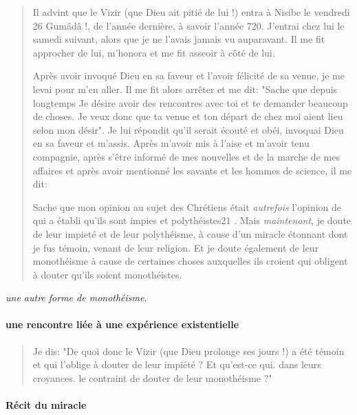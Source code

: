\begin{quote}
Il advint que le Vizir (que Dieu ait pitié de lui !) entra à Nisibe le vendredi
26 Gumâdâ !, de l'année dernière, à savoir l'année 720. J'entrai chez lui le samedi
suivant, alors que je ne l'avais jamais vu auparavant. Il me fit approcher de lui, m'honora et me fit asseoir à côté de lui.


Après avoir invoqué Dieu en sa faveur et l'avoir félicité de sa venue, je me
levai pour m'en aller. Il me fit alors arrêter et me dit: "Sache que depuis longtemps
Je désire avoir des rencontres avec toi et te demander beaucoup de choses. Je veux
donc que ta venue et ton départ de chez moi aient lieu selon mon désir". Je lui
répondit qu'il serait écouté et obéi, invoquai Dieu en sa faveur et m'assis. Après
m'avoir mis à l'aise et m'avoir tenu compagnie, après s'être informé de mes
nouvelles et de la marche de mes affaires et après avoir mentionné les savants et les
hommes de science, il me dit:


Sache que mon opinion au sujet des Chrétiens était \textit{autrefois} l'opinion de
qui a établi qu'ils sont impies et polythéistes21 . Mais \textit{maintenant}, je doute de leur
impieté et de leur polythéisme, à cause d'un miracle étonnant dont je fus témoin,
venant de leur religion. Et je doute également de leur monothéisme à cause de
certaines choses auxquelles ils croient qui obligent à douter qu'ils soient
monothéistes.
\end{quote}

\textit{une autre forme de monothéisme}. 
\paragraph{une rencontre liée à une expérience existentielle}

\begin{quote}    
Je dis: "De quoi donc le Vizir (que Dieu prolonge ses jours !) a été témoin
et qui l'oblige à douter de leur impiété ? Et qu'est-ce qui. dans leurs croyances. le
contraint de douter de leur monothéisme ?"
\end{quote}

\paragraph{Récit du miracle}

